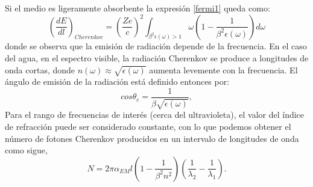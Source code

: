 Si el medio es ligeramente absorbente la expresión \ref{fermi1} queda como:
\begin{equation}
\left(\frac{dE}{dl}\right)_{Cherenkov}=\left(\frac{Ze}{c}\right)^{2}\int_{\beta^{2}\epsilon(\omega)>1} \omega\left(1-\frac{1}{\beta^{2}\epsilon(\omega)}\right)d\omega
\end{equation}
donde se observa que la emisión de radiación depende de la frecuencia. En el caso del agua, en el espectro visible, la radiación Cherenkov se produce a longitudes de onda cortas, donde  $n(\omega) \approx \sqrt{\epsilon(\omega)}$ aumenta levemente con la frecuencia. El ángulo de emisión de la radiación está definido entonces por:
\begin{equation}
cos\theta_{c}=\frac{1}{\beta\sqrt{\epsilon(\omega)}},
\end{equation}
Para el rango de frecuencias de interés (cerca del ultravioleta), el valor del índice de refracción puede ser considerado constante, con lo que podemos obtener el número de fotones Cherenkov producidos en un intervalo de longitudes de onda como sigue,
\begin{equation}
N=2\pi \alpha_{EM}l\left(1-\frac{1}{\beta^{2}n^{2}}\right)\left(\frac{1}{\lambda_{2}}-\frac{1}{\lambda_{1}}\right).
\label{cherenkovnumber}
\end{equation}




